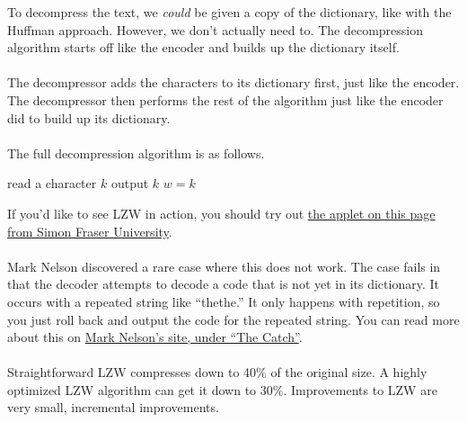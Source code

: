 \documentclass[]{article}
\theoremstyle{definition}
\begin{document}
				To decompress the text, we \emph{could} be given a copy of the dictionary, like with the Huffman approach. However, we don't actually need to. The decompression algorithm starts off like the encoder and builds up the dictionary itself.
				\\ \\
				The decompressor adds the characters to its dictionary first, just like the encoder. The decompressor then performs the rest of the algorithm just like the encoder did to build up its dictionary.
				\\ \\
				The full decompression algorithm is as follows. \\
				\begin{algorithm}[H]
					read a character $k$\;
					output $k$\;
					$w = k$\;
				\end{algorithm}

				If you'd like to see LZW in action, you should try out \href{http://www.cs.sfu.ca/CourseCentral/365/li/squeeze/LZW.html}{the applet on this page from Simon Fraser University}.
				\\ \\
				Mark Nelson discovered a rare case where this does not work. The case fails in that the decoder attempts to decode a code that is not yet in its dictionary. It occurs with a repeated string like ``thethe.'' It only happens with repetition, so you just roll back and output the code for the repeated string. You can read more about this on \href{http://marknelson.us/1989/10/01/lzw-data-compression/}{Mark Nelson's site, under ``The Catch''}.
				\\ \\
				Straightforward LZW compresses down to 40\% of the original size. A highly optimized LZW algorithm can get it down to 30\%. Improvements to LZW are very small, incremental improvements.
\end{document}

